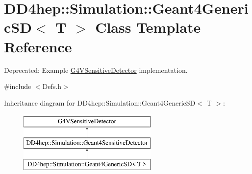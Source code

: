 \hypertarget{class_d_d4hep_1_1_simulation_1_1_geant4_generic_s_d}{}\section{D\+D4hep\+:\+:Simulation\+:\+:Geant4\+Generic\+SD$<$ T $>$ Class Template Reference}
\label{class_d_d4hep_1_1_simulation_1_1_geant4_generic_s_d}


Deprecated\+: Example \hyperlink{class_g4_v_sensitive_detector}{G4\+V\+Sensitive\+Detector} implementation.  




{\ttfamily \#include $<$Defs.\+h$>$}

Inheritance diagram for D\+D4hep\+:\+:Simulation\+:\+:Geant4\+Generic\+SD$<$ T $>$\+:\begin{figure}[H]
\begin{center}
\leavevmode
\includegraphics[height=3.000000cm]{class_d_d4hep_1_1_simulation_1_1_geant4_generic_s_d}
\end{center}
\end{figure}
